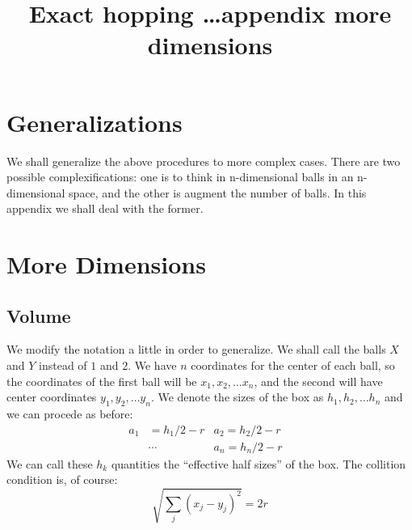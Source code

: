 \documentclass[superscriptaddress,pre,reprint,showpacs,onecolumn]{revtex4-1}
\begin{document}
\title{Exact hopping \dots appendix more dimensions}

\section{Generalizations}

We shall generalize the above procedures to more
complex cases. There are two possible complexifications: one is
to think in n-dimensional balls in an n-dimensional space, and the
other is augment the number of balls. In this appendix we shall deal
with the former. 

\section{More Dimensions}

\subsection{Volume}

We modify the notation a little in order to generalize. We shall
call the balls $X$ and $Y$ instead of $1$ and $2$. We have $n$ coordinates
for the center of each ball, so the coordinates of the first ball will be
$x_1, x_2, \ldots x_n$, and the second will have center coordinates
$y_1, y_2, \ldots y_n$. We denote the sizes of the box as $h_1, h_2 , \ldots h_n$
and we can procede as before:
\begin{align*}
  a_1&=h_1/2-r & a_2 =h_2/2-r &\\
  &\cdots &       a_n=h_n/2-r &
  \end{align*}
We can call these $h_k$ quantities the ``effective half sizes'' of the box.
The collition condition is, of course:
\begin{equation}
  \sqrt{\sum_j (x_j-y_j)^2} = 2r
\end{equation}
\end{document}
